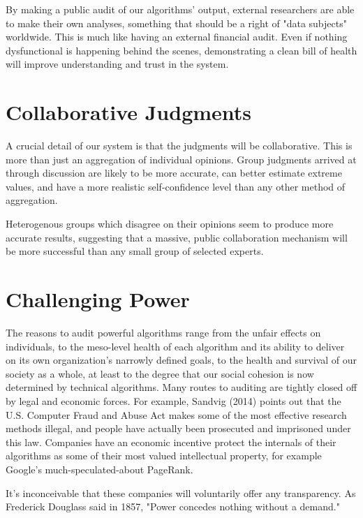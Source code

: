 \documentclass[sigconf, anonymous, review]{acmart}
\begin{document}
By making a public audit of our algorithms' output, external researchers are able to make their own analyses, something that should be a right of "data subjects" worldwide.  This is much like having an external financial audit.  Even if nothing dysfunctional is happening behind the scenes, demonstrating a clean bill of health will improve understanding and trust in the system.\cite{sandvig2014auditing}

\section{Collaborative Judgments}

A crucial detail of our system is that the judgments will be collaborative.  This is more than just an aggregation of individual opinions.  Group judgments arrived at through discussion are likely to be more accurate, can better estimate extreme values, and have a more realistic self-confidence level than any other method of aggregation.\cite{sniezek1989accuracy}

Heterogenous groups which disagree on their opinions seem to produce more accurate results, suggesting that a massive, public collaboration mechanism will be more successful than any small group of selected experts.\cite{schulz2006group}

\section{Challenging Power}

The reasons to audit powerful algorithms range from the unfair effects on individuals, to the meso-level health of each algorithm and its ability to deliver on its own organization's narrowly defined goals, to the health and survival of our society as a whole, at least to the degree that our social cohesion is now determined by technical algorithms.  Many routes to auditing are tightly closed off by legal and economic forces.  For example, Sandvig (2014) points out that the U.S. Computer Fraud and Abuse Act makes some of the most effective research methods illegal, and people have actually been prosecuted and imprisoned under this law.  Companies have an economic incentive protect the internals of their algorithms as some of their most valued intellectual property, for example Google's much-speculated-about PageRank.

It's inconceivable that these companies will voluntarily offer any transparency.  As Frederick Douglass said in 1857, "Power concedes nothing without a demand."
\end{document}
